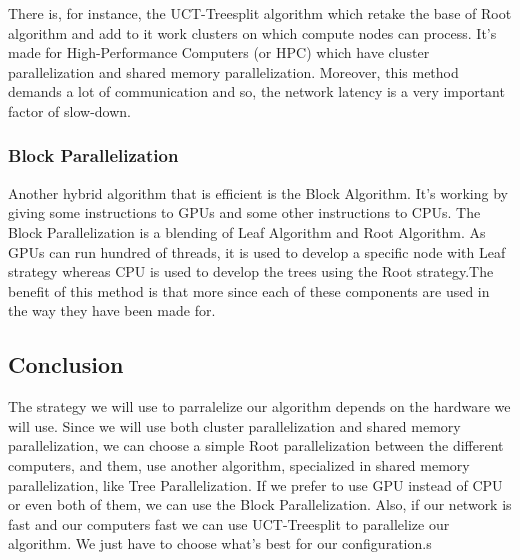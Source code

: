 There is, for instance, the UCT-Treesplit algorithm which retake the base of Root algorithm and add to it work clusters on which compute nodes can process. It’s made for High-Performance Computers (or HPC) which have cluster parallelization and shared memory parallelization. Moreover, this method demands a lot of communication and so, the network latency is a very important factor of slow-down.

\subsubsection{Block Parallelization}

Another hybrid algorithm that is efficient is the Block Algorithm. It's working by giving some instructions to GPUs and some other instructions to CPUs. The Block Parallelization is a blending of Leaf Algorithm and Root Algorithm. As GPUs can run hundred of threads, it is used to develop a specific node with Leaf strategy whereas CPU is used to develop the trees using the Root strategy.The benefit of this method is that more since each of these components are used in the way they have been made for.

\subsection{Conclusion}

The strategy we will use to parralelize our algorithm depends on the hardware we will use. Since we will use both cluster parallelization and shared memory parallelization, we can choose a simple Root parallelization between the different computers, and them, use another algorithm, specialized in shared memory parallelization, like Tree Parallelization. If we prefer to use GPU instead of CPU or even both of them, we can use the Block Parallelization. Also, if our network is fast and our computers fast we can use UCT-Treesplit to parallelize our algorithm. We just have to choose what's best for our configuration.s
